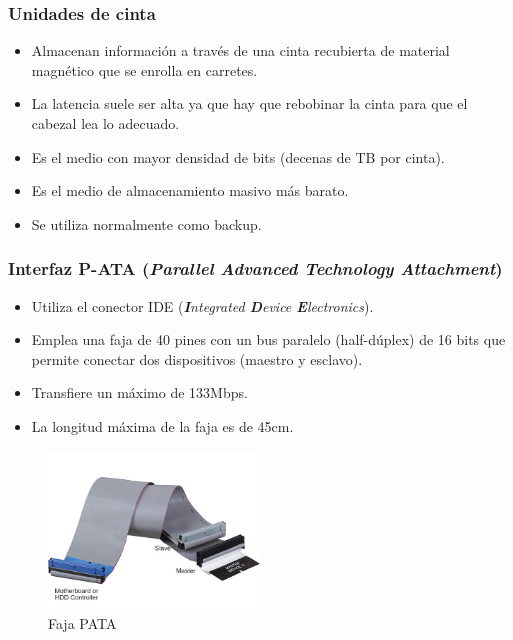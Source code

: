 \documentclass[12pt,spanish]{article}
\begin{document}
\subsubsection{Unidades de cinta}

\begin{itemize}
	\item Almacenan información a través de una cinta recubierta de material magnético que se enrolla en carretes.
	\item La latencia suele ser alta ya que hay que rebobinar la cinta para que el cabezal lea lo adecuado.
	\item Es el medio con mayor densidad de bits (decenas de TB por cinta).
	\item Es el medio de almacenamiento masivo más barato.
	\item Se utiliza normalmente como backup.
\end{itemize}

\subsubsection{Interfaz P-ATA (\textit{\textbf{P}arallel \textbf{A}dvanced \textbf{T}echnology \textbf{A}ttachment})}

\begin{itemize}
	\item Utiliza el conector IDE (\textit{\textbf{I}ntegrated \textbf{D}evice \textbf{E}lectronics}).
	\item Emplea una faja de 40 pines con un bus paralelo (half-dúplex) de 16 bits que permite conectar dos dispositivos (maestro y esclavo).
	\item Transfiere un máximo de 133Mbps.
	\item La longitud máxima de la faja es de 45cm.
\end{itemize}


\begin{figure}[H]
	\centering
	\includegraphics[width=0.5\textwidth]{patacable.jpg}
	\caption{Faja PATA}
\end{figure}
\end{document}
